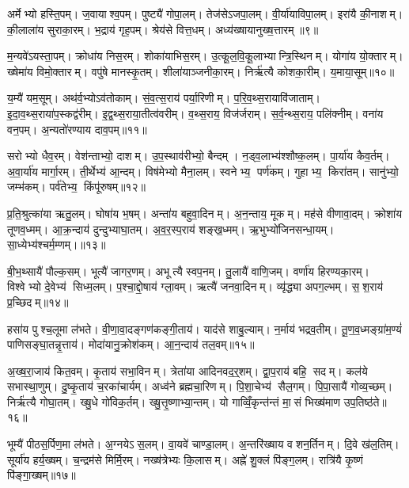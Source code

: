 अर्मेभ्यो हस्ति॒पम्। ज॒वायाश्व॒पम्। पुष्ट्यै॑ गोपा॒लम्। तेज॑सेऽजपा॒लम्। वी॒र्या॑याविपा॒लम्। इरा॑यै की॒नाशम्। की॒लाला॑य सुराका॒रम्। भ॒द्राय॑ गृह॒पम्। श्रेय॑से वित्त॒धम्। अध्य॑ख्षायानुख्ष॒त्तारम्॥९॥

म॒न्यवे॑ऽयस्ता॒पम्। क्रोधा॑य निस॒रम्। शोका॑याभिस॒रम्। उ॒त्कू॒ल॒वि॒कू॒लाभ्यान्त्रि॒स्थिनम्। योगा॑य यो॒क्तारम्। ख्षेमा॑य विमो॒क्तारम्। वपु॑षे मानस्कृ॒तम्। शीला॑याञ्जनीका॒रम्। निर्\mbox{}ऋ॑त्यै कोशका॒रीम्। य॒माया॒सूम्॥१०॥

य॒म्यै॑ यम॒सूम्। अथ॑र्व॒भ्योऽव॑तोकाम्। सं॒व॒त्स॒राय॑ पर्या॒रिणीम्। प॒रि॒व॒थ्स॒रायावि॑जाताम्। इ॒दा॒व॒थ्स॒राया॑प॒स्कद्व॑रीम्। इ॒द्व॒थ्स॒राया॒तीत्व॑वरीम्। व॒थ्स॒राय॒ विज॑र्जराम्। स॒र्व॒न्थ्स॒राय॒ पलि॑क्नीम्। वना॑य वन॒पम्। अ॒न्यतो॑रण्याय दाव॒पम्॥११॥

सरोभ्यो धैव॒रम्। वेश॑न्ताभ्यो॒ दाशम्। उ॒प॒स्थाव॑रीभ्यो॒ बैन्दम्। न॒ड्व॒लाभ्य॑श्शौष्क॒लम्। पा॒र्या॑य कैव॒र्तम्। अ॒वा॒र्या॑य मार्गा॒रम्। ती॒र्थेभ्य॑ आ॒न्दम्। विष॑मेभ्यो मैना॒लम्। स्वनेभ्य॒ पर्ण॑कम्। गुहाभ्य॒ किरा॑तम्। सानु॑भ्यो॒ जम्भ॑कम्। पर्व॑तेभ्य॒ किंपू॑रुषम्॥१२॥

प्र॒ति॒श्रुत्का॑या ऋतु॒लम्। घोषा॑य भ॒षम्। अन्ता॑य बहुवा॒दिनम्। अ॒न॒न्ताय॒ मूकम्। मह॑से वीणावा॒दम्। क्रोशा॑य तूणव॒ध्मम्। आ॒क्र॒न्दाय॑ दुन्दुभ्याघा॒तम्। अ॒व॒र॒स्प॒राय॑ शङ्ख॒ध्मम्। ऋ॒भुभ्यो॑जिनसन्धा॒यम्। सा॒ध्येभ्य॑श्चर्म॒म्णम्।॥१३॥

बी॒भ॒थ्सायै॑ पौल्क॒सम्। भूत्यै॑ जागर॒णम्। अभूत्यै स्वप॒नम्। तु॒लायै॑ वाणि॒जम्। वर्णा॑य हिरण्यका॒रम्। विश्वेभ्यो दे॒वेभ्य॑ सिध्म॒लम्। प॒श्चा॒द्दो॒षाय॑ ग्ला॒वम्। ऋत्यै॑ जनवा॒दिनम्। व्यृ॑द्ध्या अपग॒ल्भम्। स॒श॒राय॑ प्र॒च्छिदम्॥१४॥

हसा॑य पुश्च॒लूमा ल॑भते। वी॒णा॒वा॒दङ्गण॑कङ्गी॒ताय॑। याद॑से शाबु॒ल्याम्। न॒र्माय॑ भद्रव॒तीम्। तू॒ण॒व॒ध्मङ्ग्रा॑म॒ण्यं॑ पाणिसङ्घा॒तन्नृ॒त्ताय॑। मोदा॑यानु॒क्रोश॑कम्। आ॒न॒न्दाय॑ तल॒वम्॥१५॥

अ॒ख्ष॒रा॒जाय॑ कित॒वम्। कृ॒ताय॑ सभा॒विनम्। त्रेता॑या आदिनवद॒र्॒शम्। द्वा॒प॒राय॑ बहि॒ सदम्। कल॑ये सभास्था॒णुम्। दु॒ष्कृ॒ताय॑ च॒रका॑चार्यम्। अध्व॑ने ब्रह्मचा॒रिणम्। पि॒शा॒चेभ्य॑ सैल॒गम्। पि॒पा॒सायै॑ गोव्य॒च्छम्। निर्\mbox{}ऋ॑त्यै गोघा॒तम्। ख्षु॒धे गो॑विक॒र्तम्। ख्षु॒त्तृ॒ष्णाभ्या॒न्तम्। यो गाव्विँ॒कृन्त॑न्तं मा॒सं भिख्ष॑माण उप॒तिष्ठ॑ते॥१६॥

भूम्यै॑ पीठस॒र्पिण॒मा ल॑भते। अ॒ग्नयेऽस॒लम्। वा॒यवे॑ चाण्डा॒लम्। अ॒न्तरि॑ख्षाय वशन॒र्तिनम्। दि॒वे ख॑ल॒तिम्। सूर्या॑य हर्य॒ख्षम्। च॒न्द्रम॑से मिर्मि॒रम्। नख्ष॑त्रेभ्यः कि॒लासम्। अह्ने॑ शु॒क्लं पि॑ङ्ग॒लम्। रात्रि॑यै कृ॒ष्णं पि॑ङ्गा॒ख्षम्॥१७॥

